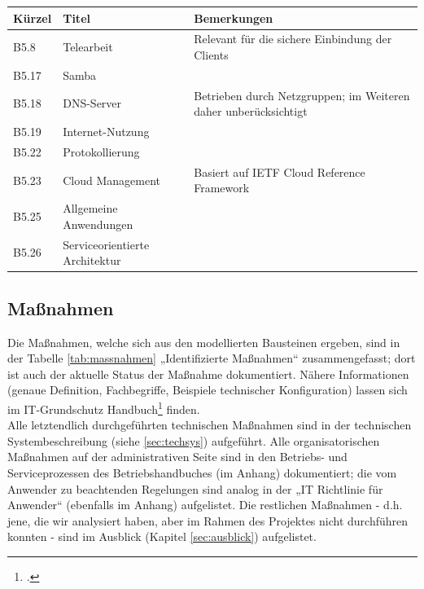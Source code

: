 \begin{minipage}{\textwidth}
\begin{center}
\begin{tabular}{p{1cm}p{5cm}p{9cm}}
\toprule
Kürzel 	& Titel & Bemerkungen \\
\midrule
B5.8	& Telearbeit	& Relevant für die sichere Einbindung der Clients \\
B5.17	& Samba			& \\
B5.18	& DNS-Server	& Betrieben durch Netzgruppen; im Weiteren daher unberücksichtigt \\
B5.19	& Internet-Nutzung	& \\
B5.22	& Protokollierung	& \\
B5.23	& Cloud Management	& Basiert auf IETF Cloud Reference Framework \\
B5.25	& Allgemeine Anwendungen	& \\
B5.26	& Serviceorientierte Architektur	& \\
\bottomrule
\end{tabular}
\end{center}
\end{minipage}

\subsection{Maßnahmen}
Die Maßnahmen, welche sich aus den modellierten Bausteinen ergeben, sind in der Tabelle \ref{tab:massnahmen} „Identifizierte Maßnahmen“ zusammengefasst; dort ist auch der aktuelle Status der Maßnahme dokumentiert. Nähere Informationen (genaue Definition, Fachbegriffe, Beispiele technischer Konfiguration) lassen sich im IT-Grundschutz Handbuch\footcite{grundschutz} finden.\\

Alle letztendlich durchgeführten technischen Maßnahmen sind in der technischen Systembeschreibung (siehe \ref{sec:techsys}) aufgeführt. Alle organisatorischen Maßnahmen auf der administrativen Seite sind in den Betriebs- und Serviceprozessen des Betriebshandbuches (im Anhang) dokumentiert;  die vom Anwender zu beachtenden Regelungen sind analog in der „IT Richtlinie für Anwender“ (ebenfalls im Anhang) aufgelistet. Die restlichen Maßnahmen - d.h. jene, die wir analysiert haben, aber im Rahmen des Projektes nicht durchführen konnten - sind im Ausblick (Kapitel \ref{sec:ausblick}) aufgelistet.


